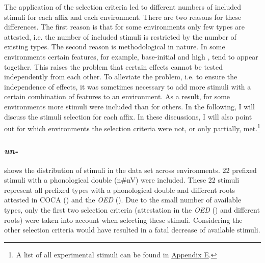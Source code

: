  

The application of the selection criteria led to different numbers of included stimuli for each affix and each environment. 
There are two reasons for these differences. The first reason is that for some environments only few types are attested, i.e. the number of included stimuli is restricted by the number of existing types. The second reason is methodological in nature. 
In some environments 
certain features, for example, base-initial  and high , tend to appear together. This raises the problem that certain effects cannot be tested independently from each other. To alleviate the problem, i.e. to ensure the independence of effects, it was sometimes necessary to add more stimuli with a certain combination of features to an environment. As a result, for some environments more stimuli were included than for others. 
In the following, I will discuss the stimuli selection for each affix. In these discussions, I will also point out for which environments the selection criteria were not, or only partially, met.\footnote{A list of all experimental stimuli can be found in \hyperref[Appendix E: Stimuli of Experimental Study]{Appendix E}.} 


\subsubsection{\textit{un-}}

 shows the distribution of  stimuli in the data set across environments. 
22  prefixed stimuli with a phonological double ({n\#nV}) were included. These 22 stimuli represent all prefixed types with a phonological double and different roots attested in  {COCA} (\citealt{Davies.20082014}) and the \textit{OED} (\citealt{OED.2013}). 
Due to the small number of available types, only the first two selection criteria (attestation in the \textit{OED} (\citealt{OED.2013}) and different roots) were taken into account when selecting these stimuli. Considering the other selection criteria would have resulted in a fatal decrease of available stimuli. 



